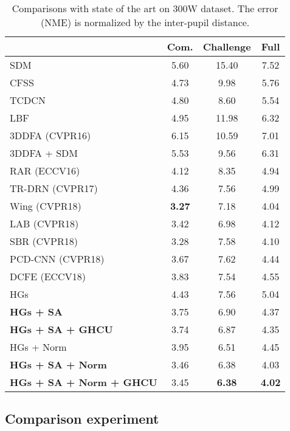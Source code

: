 \documentclass[10pt,twocolumn,letterpaper]{article}
\begin{document}
{{		\begin{table}[!thp]
			\centering
\caption{Comparisons with state of the art on 300W dataset. The error (NME) is normalized by the inter-pupil distance.}
			\vspace{3pt}
			\footnotesize
			\label{table_300w}
			\begin{tabular}{l|ccc}
				\hline
				\diagbox{Method}{subset}   & Com. & Challenge & Full \\
				\hline
				SDM~\cite{Xiong2013Supervised}    & 5.60 & 15.40 & 7.52 \\
				CFSS~\cite{zhu2015face}   & 4.73 & 9.98  & 5.76 \\
				TCDCN~\cite{Zhang2014Facial}  & 4.80  & 8.60  & 5.54 \\
				LBF~\cite{ren2016face}    & 4.95 & 11.98 & 6.32\\
				3DDFA (CVPR16)~\cite{Zhu2016Face} & 6.15 & 10.59 & 7.01 \\
				3DDFA + SDM & 5.53 & 9.56 & 6.31 \\
				RAR (ECCV16)~\cite{xiao2016robust} & 4.12 & 8.35 & 4.94 \\
				TR-DRN (CVPR17)~\cite{lv2017deep} & 4.36 & 7.56  & 4.99 \\
				Wing (CVPR18)~\cite{feng2017wing} & \textbf{3.27} & 7.18  & 4.04 \\
				LAB (CVPR18)~\cite{wu2018look} & 3.42 & 6.98  & 4.12 \\
				SBR (CVPR18)~\cite{dong2018supervision} & 3.28 & 7.58  & 4.10 \\
				PCD-CNN (CVPR18)~\cite{kumar2018disentangling} & 3.67 & 7.62  & 4.44 \\
				DCFE (ECCV18)~\cite{valle2018deeply} & 3.83 & 7.54  & 4.55 \\
				\hline
				HGs & 4.43  & 7.56  & 5.04  \\
				\textbf{HGs + SA} & 3.75 & 6.90  & 4.37  \\
				\textbf{HGs + SA + GHCU} & 3.74 & 6.87  & 4.35  \\
				HGs + Norm & 3.95  & 6.51  & 4.45  \\
				\textbf{HGs + SA + Norm} &  3.46 & 6.38  & 4.03  \\
				\textbf{HGs + SA + Norm + GHCU} &  3.45 & \textbf{6.38}  & \textbf{4.02}  \\
				\hline
\end{tabular}
		\end{table}
		
		\subsection{Comparison experiment}
		
}}
\end{document}

